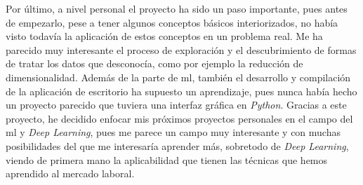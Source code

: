 Por último, a nivel personal el proyecto ha sido un paso importante, pues antes de empezarlo, pese a tener algunos conceptos básicos interiorizados, no había visto todavía la aplicación de estos conceptos en un problema real. Me ha parecido muy interesante el proceso de exploración y el descubrimiento de formas de tratar los datos que desconocía, como por ejemplo la reducción de dimensionalidad. Además de la parte de \gls{ml}, también el desarrollo y compilación de la aplicación de escritorio ha supuesto un aprendizaje, pues nunca había hecho un proyecto parecido que tuviera una interfaz gráfica en \textit{Python}. Gracias a este proyecto, he decidido enfocar mis próximos proyectos personales en el campo del \gls{ml} y \textit{Deep Learning}, pues me parece un campo muy interesante y con muchas posibilidades del que me interesaría aprender más, sobretodo de \textit{Deep Learning}, viendo de primera mano la aplicabilidad que tienen las técnicas que hemos aprendido al mercado laboral.